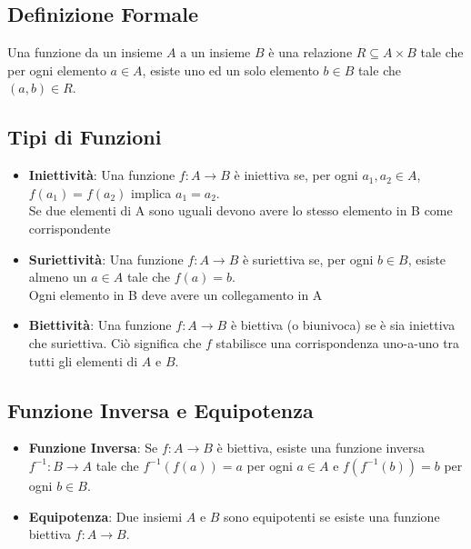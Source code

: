 \documentclass{article}
\begin{document}
\subsection{Definizione Formale}
Una funzione da un insieme $A$ a un insieme $B$ è una relazione $R \subseteq A \times B$ tale che per ogni elemento $a \in A$, esiste uno ed un solo elemento $b \in B$ tale che $(a, b) \in R$.

\subsection{Tipi di Funzioni}
\begin{itemize}
\item \textbf{Iniettività}: Una funzione $f: A \to B$ è iniettiva se, per ogni $a_1, a_2 \in A$, $f(a_1) = f(a_2)$ implica $a_1 = a_2$. \\ Se due elementi di A sono uguali devono avere lo stesso elemento in B come corrispondente
\item \textbf{Suriettività}: Una funzione $f: A \to B$ è suriettiva se, per ogni $b \in B$, esiste almeno un $a \in A$ tale che $f(a) = b$. \\ Ogni elemento in B deve avere un collegamento in A
\item \textbf{Biettività}: Una funzione $f: A \to B$ è biettiva (o biunivoca) se è sia iniettiva che suriettiva. Ciò significa che $f$ stabilisce una corrispondenza uno-a-uno tra tutti gli elementi di $A$ e $B$.
\end{itemize}

\subsection{Funzione Inversa e Equipotenza}
\begin{itemize}
\item \textbf{Funzione Inversa}: Se $f: A \to B$ è biettiva, esiste una funzione inversa $f^{-1}: B \to A$ tale che $f^{-1}(f(a)) = a$ per ogni $a \in A$ e $f(f^{-1}(b)) = b$ per ogni $b \in B$.
\item \textbf{Equipotenza}: Due insiemi $A$ e $B$ sono equipotenti se esiste una funzione biettiva $f: A \to B$.
\end{itemize}
\end{document}
